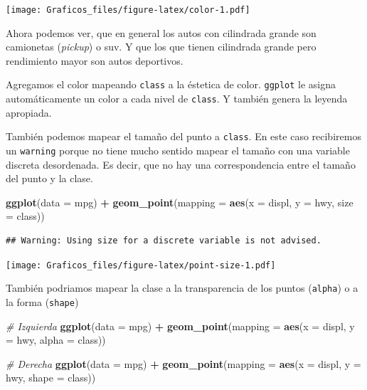 \documentclass[]{book}
\newenvironment{Shaded}{\begin{snugshade}}{\end{snugshade}}
\newcommand{\CommentTok}[1]{\textcolor[rgb]{0.56,0.35,0.01}{\textit{#1}}}
\newcommand{\DataTypeTok}[1]{\textcolor[rgb]{0.13,0.29,0.53}{#1}}
\newcommand{\KeywordTok}[1]{\textcolor[rgb]{0.13,0.29,0.53}{\textbf{#1}}}
\newcommand{\NormalTok}[1]{#1}
\newcommand{\OperatorTok}[1]{\textcolor[rgb]{0.81,0.36,0.00}{\textbf{#1}}}
\newcommand{\StringTok}[1]{\textcolor[rgb]{0.31,0.60,0.02}{#1}}
\theoremstyle{definition}
\theoremstyle{definition}
\theoremstyle{definition}
\theoremstyle{remark}
\begin{document}
\texttt{[image: Graficos\_files/figure-latex/color-1.pdf]}

Ahora podemos ver, que en general los autos con cilindrada grande son
camionetas (\emph{pickup}) o suv. Y que los que tienen cilindrada grande
pero rendimiento mayor son autos deportivos.

Agregamos el color mapeando \texttt{class} a la éstetica de color.
\texttt{ggplot} le asigna automáticamente un color a cada nivel de
\texttt{class}. Y también genera la leyenda apropiada.

También podemos mapear el tamaño del punto a \texttt{class}. En este
caso recibiremos un \texttt{warning} porque no tiene mucho sentido
mapear el tamaño con una variable discreta desordenada. Es decir, que no
hay una correspondencia entre el tamaño del punto y la clase.

\begin{Shaded}
\begin{Highlighting}[]
\KeywordTok{ggplot}\NormalTok{(}\DataTypeTok{data =}\NormalTok{ mpg) }\OperatorTok{+}
\StringTok{ }\KeywordTok{geom_point}\NormalTok{(}\DataTypeTok{mapping =} \KeywordTok{aes}\NormalTok{(}\DataTypeTok{x =}\NormalTok{ displ, }\DataTypeTok{y =}\NormalTok{ hwy, }\DataTypeTok{size =}\NormalTok{ class))}
\end{Highlighting}
\end{Shaded}

\begin{verbatim}
## Warning: Using size for a discrete variable is not advised.
\end{verbatim}

\texttt{[image: Graficos\_files/figure-latex/point-size-1.pdf]}

También podriamos mapear la clase a la transparencia de los puntos
(\texttt{alpha}) o a la forma (\texttt{shape})

\begin{Shaded}
\begin{Highlighting}[]
\CommentTok{# Izquierda}
\KeywordTok{ggplot}\NormalTok{(}\DataTypeTok{data =}\NormalTok{ mpg) }\OperatorTok{+}\StringTok{ }
\StringTok{  }\KeywordTok{geom_point}\NormalTok{(}\DataTypeTok{mapping =} \KeywordTok{aes}\NormalTok{(}\DataTypeTok{x =}\NormalTok{ displ, }\DataTypeTok{y =}\NormalTok{ hwy, }\DataTypeTok{alpha =}\NormalTok{ class))}

\CommentTok{# Derecha}
\KeywordTok{ggplot}\NormalTok{(}\DataTypeTok{data =}\NormalTok{ mpg) }\OperatorTok{+}\StringTok{ }
\StringTok{  }\KeywordTok{geom_point}\NormalTok{(}\DataTypeTok{mapping =} \KeywordTok{aes}\NormalTok{(}\DataTypeTok{x =}\NormalTok{ displ, }\DataTypeTok{y =}\NormalTok{ hwy, }\DataTypeTok{shape =}\NormalTok{ class))}
\end{Highlighting}
\end{Shaded}
\end{document}
